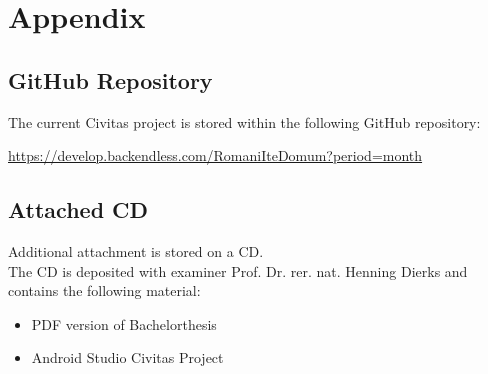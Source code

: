 \newpage
\chapter{Appendix}

\section{GitHub Repository}
The current Civitas project is stored within the following GitHub repository:

\url{https://develop.backendless.com/RomaniIteDomum?period=month}

\section{Attached CD}\label{DVD}

Additional attachment is stored on a CD.\\
The CD is deposited with examiner Prof. Dr. rer. nat. Henning Dierks and contains the following material:

\begin{center} 
   \begin{varwidth}{7in} 
      \begin{itemize} 
      	 \item PDF version of Bachelorthesis 
         \item Android Studio Civitas Project
      \end{itemize} 
   \end{varwidth} 
\end{center} 

